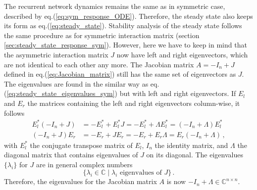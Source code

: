 \documentclass[11pt]{article}
\begin{document}
	The recurrent network dynamics remains the same as in symmetric case, described by eq.(\ref{eq:sym_response_ODE}). Therefore, the steady state also keeps its form as eq.(\ref{eq:steady_state}). Stability analysis of the steady state follows the same procedure as for symmetric interaction matrix (section \ref{sec:steady_state_response_sym}). However, here we have to keep in mind that the asymmetric interaction matrix $J$ now have left and right eigenvectors, which are not identical to each other any more. The Jacobian matrix $A = -I_n + J$ defined in eq.(\ref{eq:Jacobian_matrix}) still has the same set of eigenvectors as $J$. The eigenvalues are found in the similar way as eq.(\ref{eq:steady_state_eigenvalues_sym}) but with left and right eigenvectors. If $E_l$ and $E_r$ the matrices containing the left and right eigenvectors column-wise, it follows
		\begin{equation}
			\begin{split}
				E_l^*(-I_n + J) &= - E_l^* + E_l^* J =  - E_l^* + \Lambda E_l^* = (-I_n + \Lambda) E_l^* \\
				(-I_n + J) E_r &= - E_r + J E_r = -E_r + E_r \Lambda = E_r (-I_n + \Lambda) \, , 
			\end{split}
		\end{equation}	
	with $E_l^*$ the conjugate transpose matrix of $E_l$, $I_n$ the identity matrix, and $\Lambda$ the diagonal matrix that contains eigenvalues of $J$ on its diagonal. The eigenvalues $\{\lambda_i\}$ for $J$ are in general complex numbers
	\begin{equation}
		\{\lambda_i \in \mathbb{C} \mid \lambda_i \text{ eigenvalues of $J$}\} \, .
	\end{equation}
	Therefore, the eigenvalues for the Jacobian matrix $A$ is now $-I_n + \Lambda \in \mathbb{C}^{n \times n}$. 
	
\end{document}
